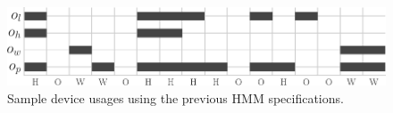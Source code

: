 \begin{figure}[t]
\centering
\includegraphics[width=\columnwidth]{figures/sample_usage.pdf}

\caption{\label{fig:sample_usage}Sample device usages using the previous HMM specifications. 
}

\end{figure}


